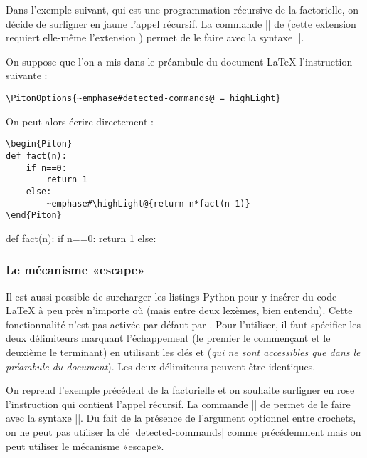 \documentclass[dvipsnames,svgnames]{article}
\begin{document}
\medskip
Dans l'exemple suivant, qui est une programmation récursive de la factorielle, on décide de surligner en jaune
l'appel récursif. La commande |\highLight| de  (cette extension requiert elle-même l'extension
) permet de le faire avec la syntaxe ||.

\smallskip
On suppose que l'on a mis dans le préambule du document LaTeX l'instruction suivante :
\begin{Verbatim}
\PitonOptions{~emphase#detected-commands@ = highLight}
\end{Verbatim}

On peut alors écrire directement :
\begin{Verbatim}
\begin{Piton}
def fact(n):
    if n==0:
        return 1
    else:
        ~emphase#\highLight@{return n*fact(n-1)}
\end{Piton}
\end{Verbatim}

\begin{Piton}
def fact(n):
    if n==0:
        return 1
    else:
\end{Piton}


\subsubsection{Le mécanisme «escape»}

\label{escape}

Il est aussi possible de surcharger les listings Python pour y insérer du code LaTeX à peu près n'importe où (mais
entre deux lexèmes, bien entendu). Cette fonctionnalité n'est pas activée par défaut par . Pour
l'utiliser, il faut spécifier les deux délimiteurs marquant l'échappement (le premier le commençant et le deuxième
le terminant) en utilisant les clés  et  (\emph{qui ne sont accessibles
que dans le préambule du document}). Les deux délimiteurs peuvent être identiques.

\medskip
On reprend l'exemple précédent de la factorielle et on souhaite surligner en rose l'instruction qui contient l'appel
récursif. La commande |\highLight| de  permet de le faire avec la syntaxe ||.
Du fait de la présence de l'argument optionnel entre crochets, on ne peut pas utiliser la clé |detected-commands|
comme précédemment mais on peut utiliser le mécanisme «escape».
\end{document}
